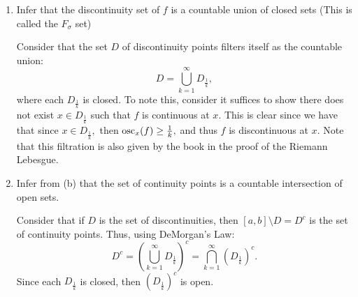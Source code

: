 \documentclass[11pt]{article}
\newcommand{\sm}{\setminus}
\begin{document}
\begin{enumerate}
    \item 
    \begin{problem}
         Infer that the discontinuity set of $f$ is a countable union of closed sets (This is called the $F_\sigma$ set)
    \end{problem}
    \begin{solution}
        Consider that the set $D$ of discontinuity points filters itself as the countable union:
        \[D = \bigcup_{k=1}^\infty D_{\frac{1}{k}},\] where each $D_{\frac{1}{k}}$ is closed. To note this, consider it suffices to show there does not exist $x\in D_{\frac{1}{k}}$ such that $f$ is continuous at $x.$ This is clear since we have that since $x\in D_{\frac{1}{k}},$ then $\text{osc}_x (f)\geq \frac{1}{k},$ and thus $f$ is discontinuous at $x.$ Note that this filtration is also given by the book in the proof of the Riemann Lebesgue.
    \end{solution}
    \item 
    \begin{problem}
     Infer from (b) that the set of continuity points is a countable intersection of open sets.
    \end{problem}
    \begin{solution}
        Consider that if $D$ is the set of discontinuities, then $[a,b]\sm D = D^c$ is the set of continuity points. Thus, using DeMorgan's Law:
        \[D^c = \left(\bigcup_{k=1}^\infty D_{\frac{1}{k}}\right)^c = \bigcap_{k=1}^\infty (D_{\frac{1}{k}})^c.\] Since each $D_{\frac{1}{k}}$ is closed, then $(D_{\frac{1}{k}})^c$ is open.
    \end{solution}
    \end{enumerate}
    
\newpage
\end{document}
